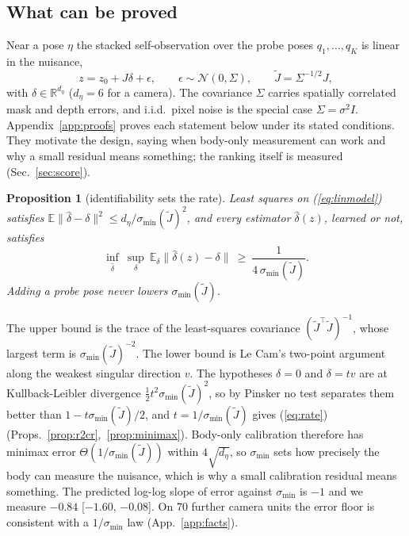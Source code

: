 \documentclass{article}
\newtheorem{proposition}{Proposition}
\begin{document}
\subsection{What can be proved}
\label{sec:theory}
Near a pose $\eta$ the stacked self-observation over the probe poses $q_1, \dots, q_K$ is linear in the nuisance,
\begin{equation}
z = z_0 + J\delta + \epsilon, \qquad \epsilon \sim \mathcal N(0, \Sigma), \qquad \tilde J = \Sigma^{-1/2} J,
\label{eq:linmodel}
\end{equation}
with $\delta \in \mathbb{R}^{d_\eta}$ ($d_\eta = 6$ for a camera). The covariance $\Sigma$ carries spatially correlated
mask and depth errors, and i.i.d.\ pixel noise is the special case $\Sigma = \sigma^2 I$. Appendix~\ref{app:proofs}
proves each statement below under its stated conditions. They motivate the design, saying when body-only
measurement can work and why a small residual means something; the ranking itself is measured (Sec.~\ref{sec:score}).

\begin{proposition}[identifiability sets the rate]
\label{thm:rate}
Least squares on (\ref{eq:linmodel}) satisfies $\mathbb{E}\|\hat\delta - \delta\|^2 \le d_\eta/\sigma_{\min}(\tilde J)^2$,
and every estimator $\hat\delta(z)$, learned or not, satisfies
\begin{equation}
\inf_{\hat\delta}\ \sup_{\delta}\ \mathbb{E}_\delta\|\hat\delta(z) - \delta\| \ \ge\ \frac{1}{4\,\sigma_{\min}(\tilde J)}.
\label{eq:rate}
\end{equation}
Adding a probe pose never lowers $\sigma_{\min}(\tilde J)$.
\end{proposition}
The upper bound is the trace of the least-squares covariance $(\tilde J^\top \tilde J)^{-1}$, whose largest term is
$\sigma_{\min}(\tilde J)^{-2}$. The lower bound is Le Cam's two-point argument along the weakest singular direction $v$.
The hypotheses $\delta = 0$ and $\delta = tv$ are at Kullback-Leibler divergence $\tfrac12 t^2\sigma_{\min}(\tilde J)^2$,
so by Pinsker no test separates them better than $1 - t\sigma_{\min}(\tilde J)/2$, and $t = 1/\sigma_{\min}(\tilde J)$
gives (\ref{eq:rate}) (Props.~\ref{prop:r2cr},~\ref{prop:minimax}). Body-only calibration therefore has minimax error
$\Theta(1/\sigma_{\min}(\tilde J))$ within $4\sqrt{d_\eta}$, so $\sigma_{\min}$ sets how precisely the body can measure the nuisance, which is why a small calibration residual means something. The predicted log-log slope of error against $\sigma_{\min}$ is $-1$ and we measure $-0.84$
[$-1.60$, $-0.08$]. On 70 further camera units the error floor is consistent with a $1/\sigma_{\min}$ law (App.~\ref{app:facts}).
\end{document}
